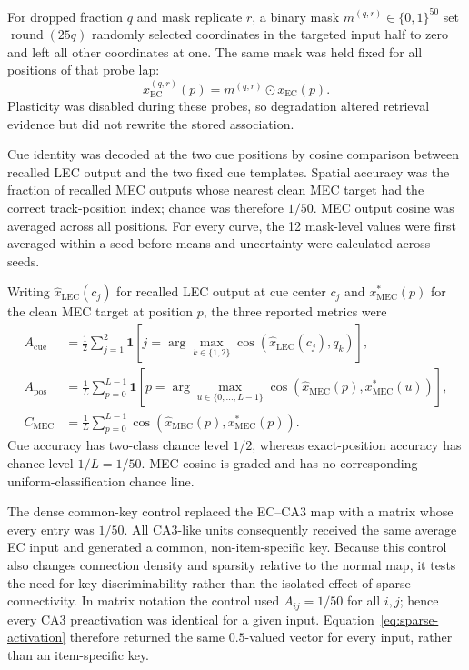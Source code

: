 For dropped fraction $q$ and mask replicate $r$, a binary mask
$m^{(q,r)}\in\{0,1\}^{50}$ set
$\operatorname{round}(25q)$ randomly selected coordinates in the targeted
input half to zero and left all other coordinates at one. The same mask was
held fixed for all positions of that probe lap:
\begin{equation}
x_{\mathrm{EC}}^{(q,r)}(p)=m^{(q,r)}\odot x_{\mathrm{EC}}(p).
\label{eq:degradation-mask}
\end{equation}
Plasticity was disabled during these probes, so degradation altered retrieval
evidence but did not rewrite the stored association.

Cue identity was decoded at the two cue positions by cosine comparison between
recalled LEC output and the two fixed cue templates. Spatial accuracy was the
fraction of recalled MEC outputs whose nearest clean MEC target had the correct
track-position index; chance was therefore $1/50$. MEC output cosine was
averaged across all positions. For every curve, the 12 mask-level values were
first averaged within a seed before means and uncertainty were calculated
across seeds.

Writing $\widehat x_{\mathrm{LEC}}(c_j)$ for recalled LEC output at cue center
$c_j$ and $x_{\mathrm{MEC}}^*(p)$ for the clean MEC target at position $p$,
the three reported metrics were
\begin{align}
A_{\mathrm{cue}}
 &=\frac{1}{2}\sum_{j=1}^{2}
 \mathbf{1}\!\left[j=\arg\max_{k\in\{1,2\}}
 \operatorname{cos}(\widehat x_{\mathrm{LEC}}(c_j),q_k)\right],\\
A_{\mathrm{pos}}
 &=\frac{1}{L}\sum_{p=0}^{L-1}
 \mathbf{1}\!\left[p=\arg\max_{u\in\{0,\ldots,L-1\}}
 \operatorname{cos}(\widehat x_{\mathrm{MEC}}(p),x_{\mathrm{MEC}}^*(u))\right],\\
C_{\mathrm{MEC}}
 &=\frac{1}{L}\sum_{p=0}^{L-1}
 \operatorname{cos}(\widehat x_{\mathrm{MEC}}(p),x_{\mathrm{MEC}}^*(p)).
\end{align}
Cue accuracy has two-class chance level $1/2$, whereas exact-position accuracy
has chance level $1/L=1/50$. MEC cosine is graded and has no corresponding
uniform-classification chance line.

The dense common-key control replaced the EC--CA3 map with a matrix whose every
entry was $1/50$. All CA3-like units consequently received the same average EC
input and generated a common, non-item-specific key. Because this control also
changes connection density and sparsity relative to the normal map, it tests
the need for key discriminability rather than the isolated effect of sparse
connectivity.
In matrix notation the control used $A_{ij}=1/50$ for all $i,j$; hence every
CA3 preactivation was identical for a given input. Equation~\ref{eq:sparse-activation}
therefore returned the same $0.5$-valued vector for every input, rather
than an item-specific key.

